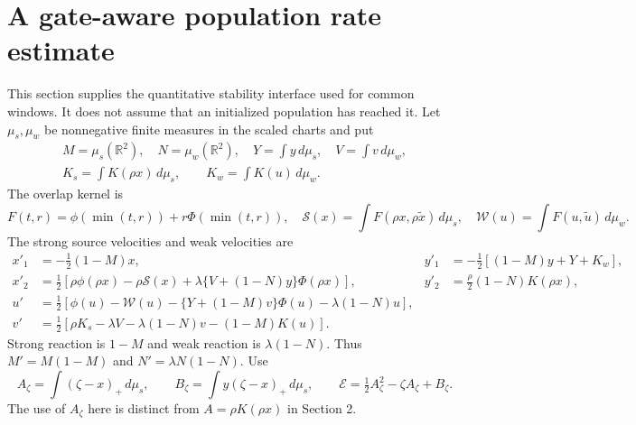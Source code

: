 \documentclass[11pt]{article}
\numberwithin{equation}{section}
\theoremstyle{remark}\newtheorem{remark}[theorem]{Remark}
\newcommand{\R}{\mathbb R}
\newcommand{\1}{\mathbf 1}
\begin{document}
\section{A gate-aware population rate estimate}
\label{inc:AN06:v1:populationrobustness}
This section supplies the quantitative stability interface used for common
windows. It does not assume that an initialized population has reached it.
Let $\mu_s,\mu_w$ be nonnegative finite measures in the scaled charts and put
\begin{gather*}
 M=\mu_s(\R^2),\quad N=\mu_w(\R^2),\quad
 Y=\int y\,d\mu_s,\quad V=\int v\,d\mu_w,\\
 K_s=\int K(\rho x)\,d\mu_s,\qquad K_w=\int K(u)\,d\mu_w.
\end{gather*}
The overlap kernel is
\[
 F(t,r)=\phi(\min(t,r))+r\Phi(\min(t,r)),\quad
 \mathcal S(x)=\int F(\rho x,\rho\widetilde x)\,d\mu_s,
 \quad \mathcal W(u)=\int F(u,\widetilde u)\,d\mu_w.
\]
The strong source velocities and weak velocities are
\begin{align}
 x'_1&=-\tfrac12(1-M)x,&
 y'_1&=-\tfrac12[(1-M)y+Y+K_w],
 \label{inc:AN06:v1:popsystem}\\
 x'_2&=\tfrac12[\rho\phi(\rho x)-\rho\mathcal S(x)
       +\lambda\{V+(1-N)y\}\Phi(\rho x)],&
 y'_2&=\tfrac\rho2(1-N)K(\rho x),\nonumber\\
 u'&=\tfrac12[\phi(u)-\mathcal W(u)-\{Y+(1-M)v\}\Phi(u)
                  -\lambda(1-N)u],\nonumber\\
 v'&=\tfrac12[\rho K_s-\lambda V-\lambda(1-N)v-(1-M)K(u)].\nonumber
\end{align}
Strong reaction is $1-M$ and weak reaction is $\lambda(1-N)$.
Thus $M'=M(1-M)$ and $N'=\lambda N(1-N)$.
Use
\[
 A_\zeta=\int(\zeta-x)_+\,d\mu_s,\qquad
 B_\zeta=\int y(\zeta-x)_+\,d\mu_s,\qquad
 \mathcal E=\tfrac12A_\zeta^2-\zeta A_\zeta+B_\zeta.
\]
The use of $A_\zeta$ here is distinct from $A=\rho K(\rho x)$ in Section 2.
\end{document}
